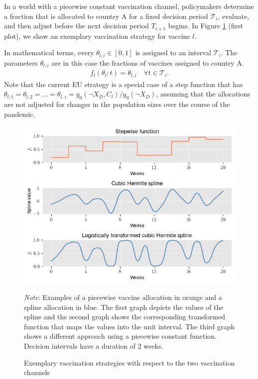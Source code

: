 In a world with a piecewise constant vaccination channel, policymakers determine a fraction that is allocated to country A for a fixed decision period $\mathcal{T}_i$, evaluate, and then adjust before the next decision period $T_{i+1}$ begins. In Figure \ref{fig:examples} (first plot), we show an exemplary vaccination strategy for vaccine $l$.

In mathematical terms, every $\theta_{l,i} \in [0,1]$ is assigned to an interval $\mathcal{T}_i$. The parameters $\theta_{l,i}$ are in this case the fractions of vaccines assigned to country A.
\begin{align}
f_l(\theta_l; t) = \theta_{l,i} \quad \forall t \in \mathcal{T}_i.
\end{align}
Note that the current EU strategy is a special case of a step function that has $\theta_{l;1}= \theta_{l,2} = \hdots = \theta_{l,z}=y_0(\neg X_D, C_l)/y_0(\neg X_D)$, assuming that the allocations are not adjusted for changes in the population sizes over the course of the pandemic.
\begin{figure}[h!]
\centering
\includegraphics[scale=0.8]{images/example_methods.png}\\
\begin{flushleft}
\scriptsize{\textit{Note}: Examples of a piecewise vaccine allocation in orange and a spline allocation in blue. The first graph depicts the values of the spline and the second graph shows the corresponding transformed function that maps the values into the unit interval. The third graph shows a different approach using a piecewise constant function. Decision intervals have a duration of 2 weeks.}
\end{flushleft}
\caption{Exemplary vaccination strategies with respect to the two vaccination channels}
\label{fig:examples}
\end{figure}

